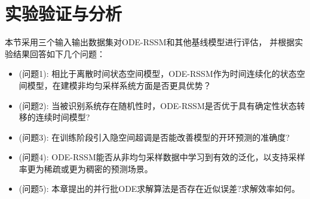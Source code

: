 \section{实验验证与分析}
\label{sec:5_experiment}
本节采用三个输入输出数据集对ODE-RSSM和其他基线模型进行评估，
并根据实验结果回答如下几个问题：
\begin{itemize}
\item (问题1): 
相比于离散时间状态空间模型，ODE-RSSM作为时间连续化的状态空间模型，在建模非均匀采样系统方面是否更具优势？

\item (问题2): 
当被识别系统存在随机性时，ODE-RSSM是否优于具有确定性状态转移的连续时间模型?

\item (问题3): 
在训练阶段引入隐空间超调是否能改善模型的开环预测的准确度?

\item (问题4): 
ODE-RSSM能否从非均匀采样数据中学习到有效的泛化，以支持采样率更为稀疏或更为稠密的预测场景。

\item (问题5): 
本章提出的并行批ODE求解算法是否存在近似误差?求解效率如何。
\end{itemize}


